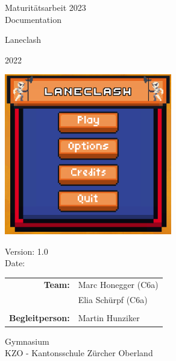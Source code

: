 \begin{titlepage}

    \begin{center}

        \vspace{1 cm}

        {\Large Maturitätsarbeit 2023 \\ Documentation} \\

        \vspace{0.5cm}

        {\Huge Laneclash}

        \vspace{0.5cm}

        2022 

        \vspace{1 cm}

        \includegraphics[height=7cm]{resources/laneclash.png}

        \vspace{1 cm}

        Version: 1.0 \\
        Date: \DTMnow \\
        \vspace{1 cm}

        \begin{tabular}{rl}
            \textbf{Team:}          & Marc Honegger (C6a) \\
                                    & Elia Schürpf (C6a)\\
                                    \\
            \textbf{Begleitperson:} & Martin Hunziker
        \end{tabular}

        \vfill

        \vspace{1cm}
        Gymnasium \\
        KZO - Kantonsschule Zürcher Oberland

    \end{center}

\end{titlepage}

